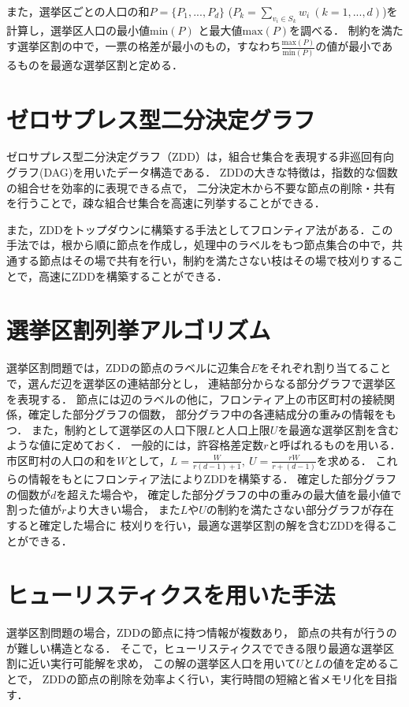 \documentclass[10pt,a4paper,notitlepage,oneside,twocolumn]{abst_jsarticle}
\begin{document}
また，選挙区ごとの人口の和$P=\{P_1,...,P_d\}$ ($P_k=\sum_{v_i\in S_k}w_i\ (k=1,...,d)$)を計算し，選挙区人口の最小値$\mathrm{min}(P)$ と最大値$\mathrm{max}(P)$を調べる．
制約を満たす選挙区割の中で，一票の格差が最小のもの，すなわち$\frac{\mathrm{max}(P)}{\mathrm{min}(P)}$の値が最小であるものを最適な選挙区割と定める．

\section{ゼロサプレス型二分決定グラフ} \label{sec:section3}
ゼロサプレス型二分決定グラフ（ZDD）\cite{minato}は，組合せ集合を表現する非巡回有向グラフ(DAG)を用いたデータ構造である．
ZDDの大きな特徴は，指数的な個数の組合せを効率的に表現できる点で，
二分決定木から不要な節点の削除・共有を行うことで，疎な組合せ集合を高速に列挙することができる．

また，ZDDをトップダウンに構築する手法としてフロンティア法がある．この手法では，根から順に節点を作成し，処理中のラベルをもつ節点集合の中で，共通する節点はその場で共有を行い，制約を満たさない枝はその場で枝刈りすることで，高速にZDDを構築することができる．

\section{選挙区割列挙アルゴリズム}
選挙区割問題では，ZDDの節点のラベルに辺集合$E$をそれぞれ割り当てることで，選んだ辺を選挙区の連結部分とし，
連結部分からなる部分グラフで選挙区を表現する．
節点には辺のラベルの他に，フロンティア上の市区町村の接続関係，確定した部分グラフの個数，
部分グラフ中の各連結成分の重みの情報をもつ．
また，制約として選挙区の人口下限$L$と人口上限$U$を最適な選挙区割を含むような値に定めておく．
一般的には，許容格差定数$r$と呼ばれるものを用いる．
市区町村の人口の和を$W$として，$L=\frac{W}{r(d-1)+1}, \ U=\frac{r W}{r+(d-1)} $を求める．
これらの情報をもとにフロンティア法によりZDDを構築する．
確定した部分グラフの個数が$d$を超えた場合や，
確定した部分グラフの中の重みの最大値を最小値で割った値が$r$より大きい場合，
また$L$や$U$の制約を満たさない部分グラフが存在すると確定した場合に
枝刈りを行い，最適な選挙区割の解を含むZDDを得ることができる．

\section{ヒューリスティクスを用いた手法}
選挙区割問題の場合，ZDDの節点に持つ情報が複数あり，
節点の共有が行うのが難しい構造となる．
そこで，ヒューリスティクスでできる限り最適な選挙区割に近い実行可能解を求め，
この解の選挙区人口を用いて$U$と$L$の値を定めることで，
ZDDの節点の削除を効率よく行い，実行時間の短縮と省メモリ化を目指す．
\end{document}
